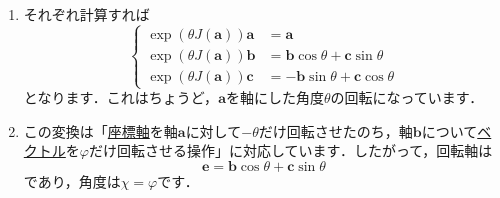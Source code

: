 \documentclass[a4paper,pdflatex,ja=standard]{bxjsarticle}
\begin{document}
\begin{enumerate}
  \item 
  それぞれ計算すれば
  \begin{equation}
    \left\{
      \begin{alignedat}{1}
        \exp(\theta J(\bm{a}))\bm{a}
        &=
        \bm{a}
        \nonumber
        \\
        \exp(\theta J(\bm{a}))\bm{b}
        &=
        \bm{b}\cos\theta+\bm{c}\sin\theta
        \nonumber
        \\
        \exp(\theta J(\bm{a}))\bm{c}
        &=
        -\bm{b}\sin\theta+\bm{c}\cos\theta
      \end{alignedat}
    \right.
  \end{equation}
  となります．これはちょうど，$\bm{a}$を軸にした角度$\theta$の回転になっています．

  \item 
  この変換は「\uline{座標軸}を軸$\bm{a}$に対して$-\theta$だけ回転させたのち，軸$\bm{b}$について\uline{ベクトル}を$\varphi$だけ回転させる操作」に対応しています．したがって，回転軸は
  \begin{equation}
    \bm{e}
    =
    \bm{b}\cos\theta
    +
    \bm{c}\sin\theta
  \end{equation}
  であり，角度は$\chi=\varphi$です．

\end{enumerate}
\end{document}
